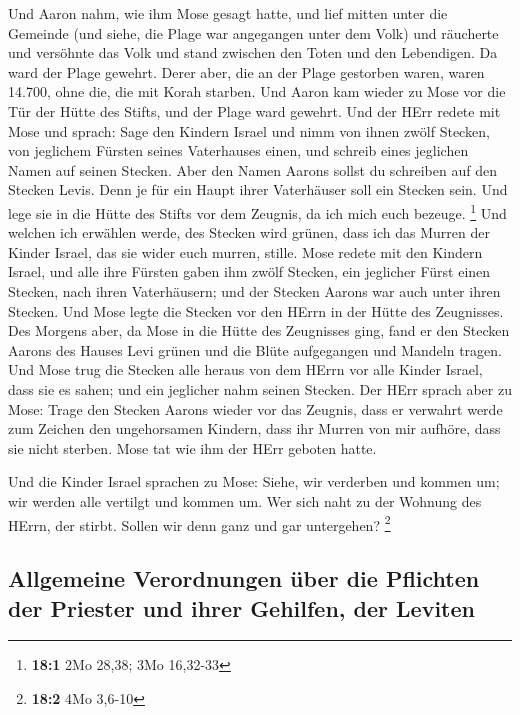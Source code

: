  Und Aaron nahm, wie ihm Mose gesagt hatte, und lief
mitten unter die Gemeinde (und siehe, die Plage war angegangen unter dem
Volk) und räucherte und versöhnte das Volk  und stand
zwischen den Toten und den Lebendigen. Da ward der Plage gewehrt.
 Derer aber, die an der Plage gestorben waren, waren
14.700, ohne die, die mit Korah starben.  Und Aaron kam
wieder zu Mose vor die Tür der Hütte des Stifts, und der Plage ward
gewehrt.  Und der HErr redete mit Mose und sprach:
 Sage den Kindern Israel und nimm von ihnen zwölf
Stecken, von jeglichem Fürsten seines Vaterhauses einen, und schreib
eines jeglichen Namen auf seinen Stecken.  Aber den Namen
Aarons sollst du schreiben auf den Stecken Levis. Denn je für ein Haupt
ihrer Vaterhäuser soll ein Stecken sein.  Und lege sie in
die Hütte des Stifts vor dem Zeugnis, da ich mich euch bezeuge.
\footnote{\textbf{18:1} 2Mo 28,38; 3Mo 16,32-33}  Und
welchen ich erwählen werde, des Stecken wird grünen, dass ich das Murren
der Kinder Israel, das sie wider euch murren, stille. 
Mose redete mit den Kindern Israel, und alle ihre Fürsten gaben ihm
zwölf Stecken, ein jeglicher Fürst einen Stecken, nach ihren
Vaterhäusern; und der Stecken Aarons war auch unter ihren Stecken.
 Und Mose legte die Stecken vor den HErrn in der Hütte
des Zeugnisses.  Des Morgens aber, da Mose in die Hütte
des Zeugnisses ging, fand er den Stecken Aarons des Hauses Levi grünen
und die Blüte aufgegangen und Mandeln tragen.  Und Mose
trug die Stecken alle heraus von dem HErrn vor alle Kinder Israel, dass
sie es sahen; und ein jeglicher nahm seinen Stecken.  Der
HErr sprach aber zu Mose: Trage den Stecken Aarons wieder vor das
Zeugnis, dass er verwahrt werde zum Zeichen den ungehorsamen Kindern,
dass ihr Murren von mir aufhöre, dass sie nicht sterben. 
Mose tat wie ihm der HErr geboten hatte.

 Und die Kinder Israel sprachen zu Mose: Siehe, wir
verderben und kommen um; wir werden alle vertilgt und kommen um.
 Wer sich naht zu der Wohnung des HErrn, der stirbt.
Sollen wir denn ganz und gar untergehen? \footnote{\textbf{18:2} 4Mo
  3,6-10}

\hypertarget{allgemeine-verordnungen-uxfcber-die-pflichten-der-priester-und-ihrer-gehilfen-der-leviten}{%
\subsection{Allgemeine Verordnungen über die Pflichten der Priester und
ihrer Gehilfen, der
Leviten}\label{allgemeine-verordnungen-uxfcber-die-pflichten-der-priester-und-ihrer-gehilfen-der-leviten}}

